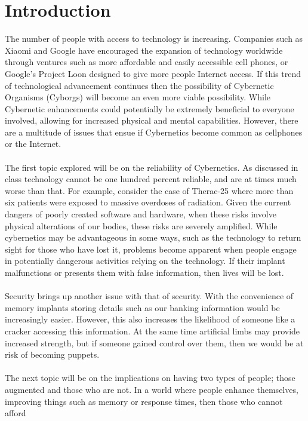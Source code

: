 \documentclass[12pt,a4paper,notitlepage]{article}
\begin{document}
\section{Introduction}
The number of people with access to technology is increasing. Companies such as
Xiaomi and Google have encouraged the expansion of technology worldwide through
ventures such as more affordable and easily accessible cell phones, or Google's
Project Loon designed to give more people Internet access. If this trend of
technological advancement continues then the possibility of Cybernetic Organisms
(Cyborgs) will become an even more viable possibility. While Cybernetic
enhancements could potentially be extremely beneficial to everyone involved,
allowing for increased physical and mental capabilities. However, there are a
multitude of issues that ensue if Cybernetics become common as cellphones or the
Internet.
\\\\
The first topic explored will be on the reliability of Cybernetics. As discussed
in class technology cannot be one hundred percent reliable, and are at times
much worse than that. For example, consider the case of Therac-25 where more
than six patients were exposed to massive overdoses of radiation. Given the
current dangers of poorly created software and hardware, when these risks
involve physical alterations of our bodies, these risks are severely amplified.
While cybernetics may be advantageous in some ways, such as the technology to
return sight for those who have lost it, problems become apparent when people
engage in potentially dangerous activities relying on the technology. If their
implant malfunctions or presents them with false information, then lives will be
lost.
\\\\
Security brings up another issue with that of security. With the convenience of
memory implants storing details such as our banking information would be
increasingly easier. However, this also increases the likelihood of someone like
a cracker accessing this information. At the same time artificial limbs may
provide increased strength, but if someone gained control over them, then we
would be at risk of becoming puppets.
\\\\
The next topic will be on the implications on having two types of people; those
augmented and those who are not. In a world where people enhance themselves,
improving things such as memory or response times, then those who cannot afford
\end{document}
